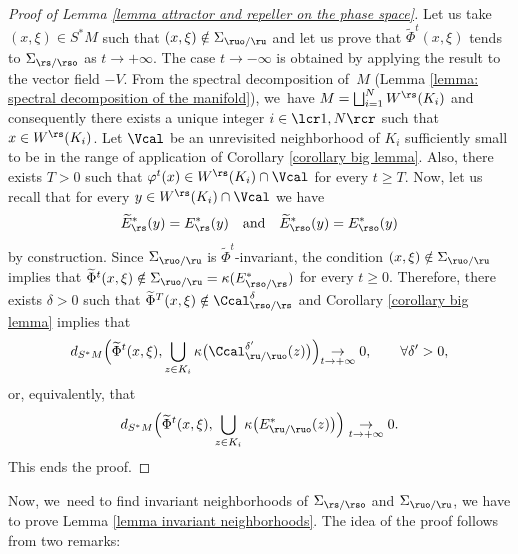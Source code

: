 \begin{proof}[Proof of Lemma \ref{lemma attractor and repeller on the phase space}] Let us take $(x,\xi) \in S^* M$ such that $(x,\xi) \notin \Sigma_{\ruo/\ru}$ and let us prove that $\widetilde{\Phi}^t (x, \xi)$ tends to $\Sigma_{\rs/\rso}$ as $t \to +\infty$. The case $t\to-\infty$ is obtained by applying the result to the vector field $-V$. From the spectral decomposition of~$M$ (Lemma \ref{lemma: spectral decomposition of the manifold}), we~have $M = \bigsqcup_{i = 1}^N W^\rs (K_i)$ and consequently there exists a unique integer $i\in\lcr1,N\rcr$ such that $x \in W^\rs (K_i)$. Let $\Vcal$ be an unrevisited neighborhood of $K_i$ sufficiently small to be in the range of application of Corollary \ref{corollary big lemma}. Also, there exists $T > 0$ such that $\varphi^t (x) \in W^\rs (K_i) \cap \Vcal$ for every $t \geq T$. Now, let us recall that for every $y \in W^\rs (K_i) \cap \Vcal$ we have
\[
\widetilde{E}_\rs^* (y) = E_\rs^* (y) \quad \text{and} \quad \widetilde{E}_{\rso}^* (y) = E_{\rso}^* (y)
\]
by construction. Since $\Sigma_{\ruo/\ru}$ is $\widetilde{\Phi}^t$-invariant, the condition $(x,\xi) \notin \Sigma_{\ruo/\ru} $ implies that $\widetilde{\Phi}^t (x,\xi) \notin \Sigma_{\ruo/\ru} = \kappa(E_{\rso/\rs}^*)$ for every $t \geq 0$. Therefore, there exists $\delta > 0$ such that $ \widetilde{\Phi}^T (x,\xi) \notin \Ccal_{\rso/\rs}^{\delta}$ and Corollary \ref{corollary big lemma} implies that
\[
d_{S^* M} \Bigl(\widetilde{\Phi}^t (x,\xi), \bigcup_{z \in K_i} \kappa \bigl(\Ccal_{\ru/\ruo}^{\delta'} (z) \bigr) \Bigl) \underset{t \to +\infty}{\to} 0, \qquad \forall \delta' > 0,
\]
or, equivalently, that
\[
d_{S^* M} \Bigl(\widetilde{\Phi}^t (x,\xi), \bigcup_{z \in K_i } \kappa \bigl(E_{\ru/\ruo}^* (z)\bigr) \Bigr) \underset{t \to +\infty}{\to} 0.
\]
This ends the proof.
\end{proof}

\label{subsection: Lemma invariant neighborhoods for the Hamiltonian flow}

Now, we~need to find invariant neighborhoods of $\Sigma_{\rs/\rso}$ and $\Sigma_{\ruo/\ru}$, \ie we have to prove Lemma \ref{lemma invariant neighborhoods}. The idea of the proof follows from two remarks:

